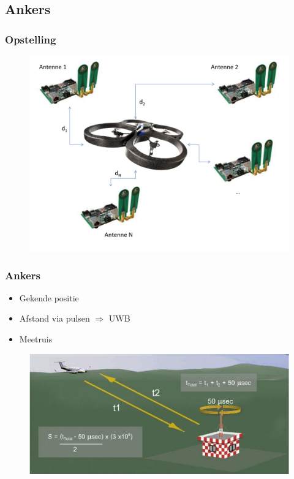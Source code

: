 \documentclass{beamer}
\begin{document}
\subsection{Ankers}
  \begin{frame}
    \frametitle{Opstelling}
    \begin{figure}
      \begin{center}
        \includegraphics[width=.8\textwidth]{images/opstelling.pdf}
      \end{center}
    \end{figure}
  \end{frame}
  \begin{frame}
    \frametitle{Ankers}
    \begin{itemize}
      \item Gekende positie
      \item Afstand via pulsen $\Rightarrow$ UWB
      \item Meetruis
    \end{itemize}
    \begin{figure}
      \begin{center}
        \includegraphics[width=.8\textwidth]{images/DME.jpg}
      \end{center}
    \end{figure}
  \end{frame}
\end{document}
